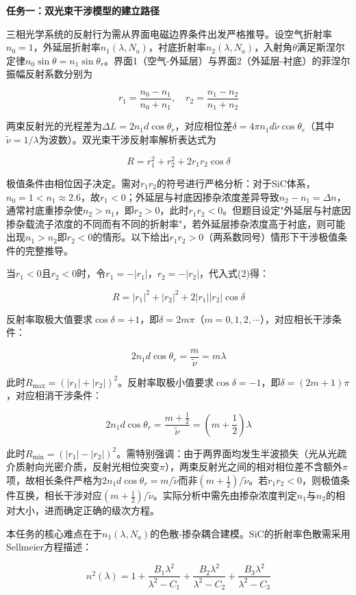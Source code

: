 \documentclass{mcmthesis}
\begin{document}
\textbf{任务一：双光束干涉模型的建立路径}

三相光学系统的反射行为需从界面电磁边界条件出发严格推导。设空气折射率$n_0=1$，外延层折射率$n_1(\lambda, N_a)$，衬底折射率$n_2(\lambda, N_a)$，入射角$\theta$满足斯涅尔定律$n_0\sin\theta=n_1\sin\theta_r$。界面1（空气-外延层）与界面2（外延层-衬底）的菲涅尔振幅反射系数分别为

$$r_1=\frac{n_0-n_1}{n_0+n_1},\quad r_2=\frac{n_1-n_2}{n_1+n_2} \tag{1}$$

两束反射光的光程差为$\Delta L=2n_1d\cos\theta_r$，对应相位差$\delta=4\pi n_1d\tilde{\nu}\cos\theta_r$（其中$\tilde{\nu}=1/\lambda$为波数）。双光束干涉反射率解析表达式为

$$R = r_1^2 + r_2^2 + 2r_1r_2\cos\delta \tag{2}$$

极值条件由相位因子决定。需对$r_1r_2$的符号进行严格分析：对于SiC体系，$n_0=1<n_1\approx 2.6$，故$r_1<0$；外延层与衬底因掺杂浓度差异导致$n_2-n_1=\Delta n$，通常衬底重掺杂使$n_2>n_1$，即$r_2>0$，此时$r_1r_2<0$。但题目设定"外延层与衬底因掺杂载流子浓度的不同而有不同的折射率"，若外延层掺杂浓度高于衬底，则可能出现$n_1>n_2$即$r_2<0$的情形。以下给出$r_1r_2>0$（两系数同号）情形下干涉极值条件的完整推导。

当$r_1<0$且$r_2<0$时，令$r_1=-|r_1|$，$r_2=-|r_2|$，代入式(2)得：

$$R = |r_1|^2 + |r_2|^2 + 2|r_1||r_2|\cos\delta \tag{3}$$

反射率取极大值要求$\cos\delta=+1$，即$\delta=2m\pi$（$m=0,1,2,\cdots$），对应相长干涉条件：

$$2n_1d\cos\theta_r = \frac{m}{\tilde{\nu}} = m\lambda \tag{4}$$

此时$R_{\max}=(|r_1|+|r_2|)^2$。反射率取极小值要求$\cos\delta=-1$，即$\delta=(2m+1)\pi$，对应相消干涉条件：

$$2n_1d\cos\theta_r = \frac{m+\frac{1}{2}}{\tilde{\nu}} = \left(m+\frac{1}{2}\right)\lambda \tag{5}$$

此时$R_{\min}=(|r_1|-|r_2|)^2$。需特别强调：由于两界面均发生半波损失（光从光疏介质射向光密介质，反射光相位突变$\pi$），两束反射光之间的相对相位差不含额外$\pi$项，故相长条件严格为$2n_1d\cos\theta_r=m/\tilde{\nu}$而非$(m+\frac{1}{2})/\tilde{\nu}$。若$r_1r_2<0$，则极值条件互换，相长干涉对应$(m+\frac{1}{2})/\tilde{\nu}$。实际分析中需先由掺杂浓度判定$n_1$与$n_2$的相对大小，进而确定正确的级次方程。

本任务的核心难点在于$n_1(\lambda, N_a)$的色散-掺杂耦合建模。SiC的折射率色散需采用Sellmeier方程描述：

$$n^2(\lambda)=1+\frac{B_1\lambda^2}{\lambda^2-C_1}+\frac{B_2\lambda^2}{\lambda^2-C_2}+\frac{B_3\lambda^2}{\lambda^2-C_3} \tag{6}$$
\end{document}
